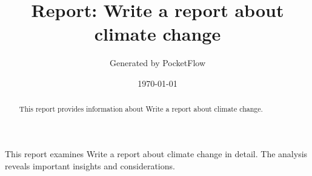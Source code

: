 \documentclass[11pt,a4paper]{article}
\begin{document}
\title{Report: Write a report about climate change}
\author{Generated by PocketFlow}
\date{\today}

\maketitle

\begin{abstract}
This report provides information about Write a report about climate change.
\end{abstract}

\tableofcontents
\newpage

This report examines Write a report about climate change in detail. The analysis reveals important insights and considerations.
\end{document}
